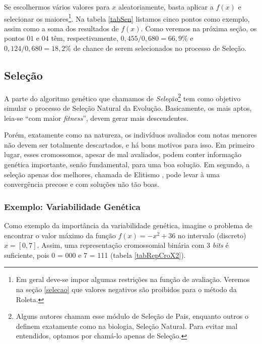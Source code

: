 	
	Se escolhermos vários valores para $x$ aleatoriamente, basta aplicar a $f(x)$ e selecionar os maiores\footnote{Em geral deve-se impor algumas restrições na função de avaliação. Veremos na seção \ref{selecao} que valores negativos são proibidos para o método da Roleta.}. Na tabela \ref{tabSen} listamos cinco pontos como exemplo, assim como a soma dos resultados de $f(x)$. Como veremos na próxima seção, os pontos $01$ e $04$ têm, respectivamente, $0,455/0,680 = 66,9\%$ e $ 0,124/0,680 = 18,2\%$ de chance de serem selecionados no processo de Seleção.
	
	\subsection{\label{selecao}Seleção}
	
	A parte do algoritmo genético que chamamos de \textit{Seleção}\footnote{Alguns autores chamam esse módulo de Seleção de Pais, enquanto outros o definem exatamente como na biologia, Seleção Natural. Para evitar mal entendidos, optamos por chamá-lo apenas de Seleção.} tem como objetivo simular o processo de Seleção Natural da Evolução. Basicamente, os  mais aptos, leia-se ``com maior \textit{fitness}'', devem gerar mais descendentes.
	
	Porém, exatamente como na natureza, os indivíduos avaliados com notas menores não devem ser totalmente descartados, e há bons motivos para isso. Em primeiro lugar, esses cromossomos, apesar de mal avaliados, podem conter informação genética importante, senão fundamental, para uma boa solução. Em segundo, a seleção apenas dos melhores, chamada de Elitismo \cite{Bhattacharyya2004}, pode levar à uma convergência precose e com soluções não tão boas.
	
	\subsubsection{\label{ExemploVariabilidade}Exemplo: Variabilidade Genética}
	
	Como exemplo da importância da variabilidade genética, imagine o problema de encontrar o valor máximo da função $f(x) = -x^2 + 36$ no intervalo (discreto) $x = [0,7]$. Assim, uma representação cromossomial binária com 3 \textit{bits} é suficiente, pois 0 = 000 e 7 = 111 (tabela \ref{tabRepCroX2}).
	

